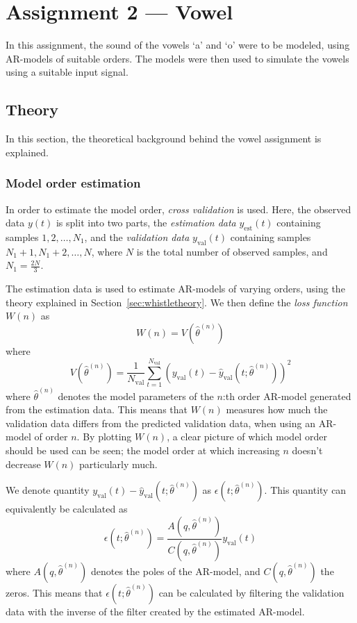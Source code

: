\documentclass{IEEEtran}
\newcommand{\val}[1]{#1_{\text{val}}}
\newcommand{\est}[1]{#1_{\text{est}}}
\begin{document}
\section{Assignment 2 --- Vowel}

In this assignment, the sound of the vowels `a' and `o' were to be
modeled, using AR-models of suitable orders. The models were then
used to simulate the vowels using a suitable input signal.

\subsection{Theory}
\label{sub:voweltheory}

In this section, the theoretical background behind the vowel assignment is
explained.

\subsubsection{Model order estimation}
\label{ssub:modelorderestimation}

In order to estimate the model order, \textit{cross validation} is used.
Here, the observed data $y(t)$ is split into two
parts, the \textit{estimation data} $\est{y}(t)$ containing samples $1,
2,\ldots,N_1$, and
the \textit{validation data} $\val{y}(t)$ containing samples $N_1 + 1, N_1 + 2,
\ldots,N$,
where $N$ is the total number of observed
samples, and $N_1 = \frac{2N}{3}$.

The estimation data is used to estimate AR-models of varying orders, using
the theory explained in Section~\ref{sec:whistletheory}. We then define the
\textit{loss function} $W(n)$ as
\begin{equation*}
    W(n) = V(\hat{\theta}^{(n)})
\end{equation*}
where
\begin{equation*}
    V(\hat{\theta}^{(n)}) = \frac{1}{\val{N}}\sum^{\val{N}}_{t=1}(\val{y}(t) -
        \val{\hat{y}}(t;\hat{\theta}^{(n)}))^2
\end{equation*}
where $\hat{\theta}^{(n)}$ denotes the model parameters of the $n$:th order
AR-model generated from the estimation data. This means that $W(n)$ measures
how much the validation data differs from the predicted validation data, when
using an AR-model of order $n$. By plotting $W(n)$, a
clear picture of which model order should be used can be seen; the model order at which
increasing $n$ doesn't decrease $W(n)$ particularly much.

We denote quantity $\val{y}(t) - \val{\hat{y}}(t;\hat{\theta}^{(n)})$ as
$\epsilon(t;\hat{\theta}^{(n)})$. This quantity can equivalently be calculated
as
\begin{equation*}
    \epsilon(t;\hat{\theta}^{(n)}) =
    \frac{A(q,\hat{\theta}^{(n)})}{C(q,\hat{\theta}^{(n)})}\val{y}(t)
\end{equation*}
where $A(q,\hat{\theta}^{(n)})$ denotes the poles of the AR-model, and
$C(q,\hat{\theta}^{(n)})$ the zeros. This means that
$\epsilon(t;\hat{\theta}^{(n)})$ can be calculated by filtering the validation
data with the inverse of the filter created by the estimated AR-model.
\end{document}
